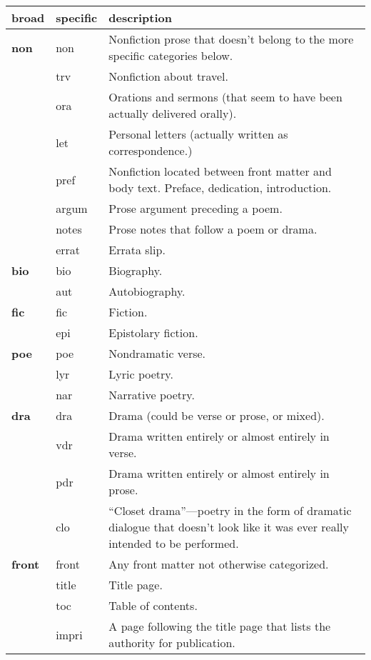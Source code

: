\documentclass[paper=a4, fontsize=12pt]{scrartcl}
\numberwithin{equation}{section}		%
\numberwithin{figure}{section}			%
\numberwithin{table}{section}				%
\begin{document}
\begin{center}
\begin{longtable}{ | l | l | p{10cm} |}
\hline
broad & specific & description \\ \hline \hline
\textbf{non} & non & Nonfiction prose that doesn't belong to the more specific categories below. \\ \hline
 & trv & Nonfiction about travel. \\ \hline
 & ora	& Orations and sermons (that seem to have been actually delivered orally). \\ \hline
 & let & Personal letters (actually written as correspondence.) \\ \hline
& pref & Nonfiction located between front matter and body text. Preface, dedication, introduction. \\ \hline
& argum & Prose argument preceding a poem. \\ \hline
& notes & Prose notes that follow a poem or drama. \\ \hline
& errat & Errata slip.  \\ \hline
\textbf{bio} & bio & Biography. \\ \hline
 & aut & Autobiography. \\ \hline
\textbf{fic} & fic & Fiction. \\ \hline
 & epi & Epistolary fiction. \\ \hline
 \textbf{poe} & poe & Nondramatic verse. \\ \hline
& lyr & Lyric poetry. \\ \hline
& nar & Narrative poetry. \\ \hline
\textbf{dra} & dra & Drama (could be verse or prose, or mixed).  \\ \hline
& vdr & Drama written entirely or almost entirely in verse.  \\ \hline
& pdr & Drama written entirely or almost entirely in prose.  \\ \hline
& clo & ``Closet drama''---poetry in the form of dramatic dialogue that doesn't look like it was ever really intended to be performed.  \\ \hline
\textbf{front} & front & Any front matter not otherwise categorized.  \\ \hline
& title & Title page.  \\ \hline
& toc & Table of contents.  \\ \hline
& impri & A page following the title page that lists the authority for publication.  \\ \hline

\end{longtable}
\end{center}
\end{document}
